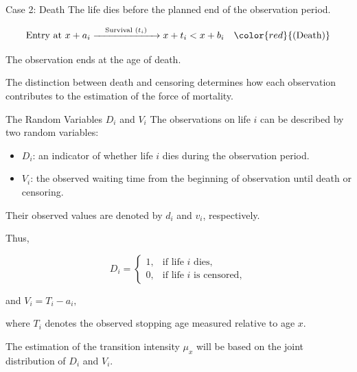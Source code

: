 \documentclass[
  ignorenonframetext,
  aspectratio=169,
]{beamer}
\providecommand{\tightlist}{%
  \setlength{\itemsep}{0pt}\setlength{\parskip}{0pt}}
\begin{document}
\begin{frame}{Case 2: Death}
\protect{}\label{case-2-death}
The life dies before the planned end of the observation period.

\[
\text{Entry at } x+a_i \xrightarrow{\quad \text{Survival } (t_i) \quad} x+t_i < x+b_i \quad \color{red}{\text{(Death)}}
\]

The observation ends at the age of death.

The distinction between death and censoring determines how each
observation contributes to the estimation of the force of mortality.
\end{frame}

\begin{frame}{The Random Variables \(D_i\) and \(V_i\)}
\protect{}\label{the-random-variables-d_i-and-v_i}
The observations on life \(i\) can be described by two random variables:

\begin{itemize}
\tightlist
\item
  \(D_i\): an indicator of whether life \(i\) dies during the
  observation period.
\item
  \(V_i\): the observed waiting time from the beginning of observation
  until death or censoring.
\end{itemize}

Their observed values are denoted by \(d_i\) and \(v_i\), respectively.

Thus,

\[
D_i =
\begin{cases}
1, & \text{if life } i \text{ dies},\\
0, & \text{if life } i \text{ is censored},
\end{cases}
\]

and \(V_i=T_i-a_i,\)

where \(T_i\) denotes the observed stopping age measured relative to age
\(x\).

The estimation of the transition intensity \(\mu_x\) will be based on
the joint distribution of \(D_i\) and \(V_i\).
\end{frame}
\end{document}
